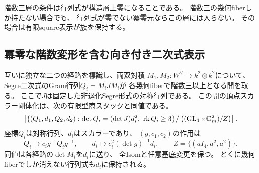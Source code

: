 \begin{remark}
階数三層の条件は行列式が構造層上零になることである。
階数三の幾何fiberしか持たない場合でも、
行列式が零でない冪零元ならこの層には入らない。
その場合は有限square表示が族を保持する。
\end{remark}

\subsection{冪零な階数変形を含む向き付き二次式表示}
\label{subsec:qa-square-oriented-quadratic-forms}

\begin{theorem}[向き付きGram表示による相対square幾何]
\label{thm:qa-square-oriented-gram-stack}
互いに独立な二つの経路を標識し、両双対積
$M_1,M_2:W^\vee\to k^2\otimes k^2$について、
Segre二次式のGram行列$Q_i=M_i^{\mathrm{t}}J M_i$が
各幾何fiberで階数三以上となる開を取る。
ここで$J$は固定した非退化Segre形式の対称行列である。
この開の頂点スカラー剛体化は、次の有限型商スタックと同値である。
\[
 \left[
 \{(Q_1,d_1,Q_2,d_2):
       \det Q_i=(\det J)d_i^2,\ \operatorname{rk}Q_i\ge3\}
 \big/
 \left((\operatorname{GL}_4\times\mathbb G_m^2)/Z\right)
 \right].
\]
座標$Q_i$は対称行列、$d_i$はスカラーであり、
$(g,c_1,c_2)$の作用は
\[
 Q_i\longmapsto c_i g^{-{\mathrm{t}}}Q_i g^{-1},\qquad
 d_i\longmapsto c_i^2(\det g)^{-1}d_i,\qquad
 Z=\{(aI_4,a^2,a^2)\}.
\]
同値は各経路の$\det M_i$を$d_i$に送り、
全Isomと任意基底変更を保つ。
とくに幾何fiberでしか消えない行列式も$d_i$に保持される。
\end{theorem}
